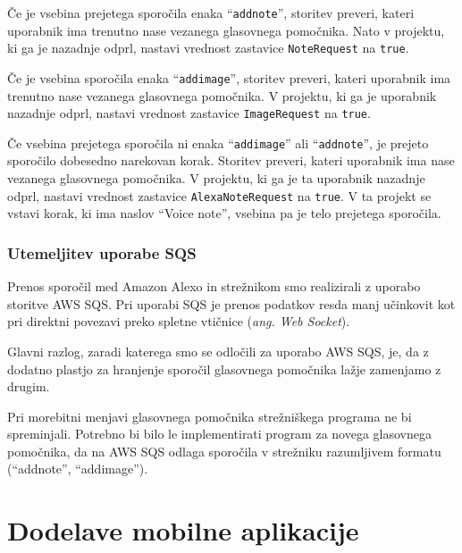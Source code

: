 \documentclass[a4paper, 12pt]{book}
\begin{document}
Če je vsebina prejetega sporočila enaka \enquote{\texttt{addnote}}, storitev preveri, kateri uporabnik ima trenutno nase vezanega glasovnega pomočnika.
Nato v projektu, ki ga je nazadnje odprl, nastavi vrednost zastavice \texttt{NoteRequest} na \texttt{true}.


Če je vsebina sporočila enaka \enquote{\texttt{addimage}}, storitev preveri, kateri uporabnik ima trenutno nase vezanega glasovnega pomočnika.
V projektu, ki ga je uporabnik nazadnje odprl, nastavi vrednost zastavice \texttt{ImageRequest} na \texttt{true}.

Če vsebina prejetega sporočila ni enaka \enquote{\texttt{addimage}} ali \enquote{\texttt{addnote}}, je prejeto sporočilo dobesedno narekovan korak.
Storitev preveri, kateri uporabnik ima nase vezanega glasovnega pomočnika.
V projektu, ki ga je ta uporabnik nazadnje odprl, nastavi vrednost zastavice \texttt{AlexaNoteRequest} na \texttt{true}.
V ta projekt se vstavi korak, ki ima naslov \enquote{Voice note}, vsebina pa je telo prejetega sporočila.

\subsubsection{Utemeljitev uporabe SQS}

Prenos sporočil med Amazon Alexo in strežnikom smo realizirali z uporabo storitve AWS SQS.
Pri uporabi SQS je prenos podatkov resda manj učinkovit kot pri direktni povezavi preko spletne vtičnice (\textit{ang. Web Socket}).

Glavni razlog, zaradi katerega smo se odločili za uporabo AWS SQS, je, da z dodatno plastjo za hranjenje sporočil glasovnega pomočnika lažje zamenjamo z drugim.

Pri morebitni menjavi glasovnega pomočnika strežniškega programa ne bi spreminjali.
Potrebno bi bilo le implementirati program za novega glasovnega pomočnika, da na AWS SQS odlaga sporočila v strežniku razumljivem formatu (\enquote{addnote}, \enquote{addimage}).













\section{Dodelave mobilne aplikacije}
\end{document}
